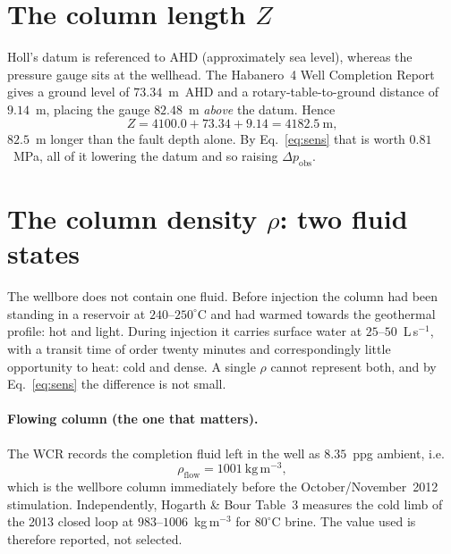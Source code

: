 \documentclass[11pt]{article}
\begin{document}
\section{The column length $Z$}

Holl's datum is referenced to AHD (approximately sea level), whereas the
pressure gauge sits at the wellhead. The Habanero~4 Well Completion Report
\cite{wcr} gives a ground level of $73.34$~m~AHD and a rotary-table-to-ground
distance of $9.14$~m, placing the gauge $82.48$~m \emph{above} the datum.
Hence
\begin{equation}
  Z = 4100.0 + 73.34 + 9.14 = 4182.5~\mathrm{m},
\end{equation}
$82.5$~m longer than the fault depth alone. By Eq.~\eqref{eq:sens} that is
worth $0.81$~MPa, all of it lowering the datum and so raising
$\Delta p_{\mathrm{obs}}$.

\section{The column density $\rho$: two fluid states}

The wellbore does not contain one fluid. Before injection the column had been
standing in a reservoir at $240$--$250^\circ$C and had warmed towards the
geothermal profile: hot and light. During injection it carries surface water at
$25$--$50$~L\,s$^{-1}$, with a transit time of order twenty minutes and
correspondingly little opportunity to heat: cold and dense. A single $\rho$
cannot represent both, and by Eq.~\eqref{eq:sens} the difference is not small.

\paragraph{Flowing column (the one that matters).}
The WCR \cite{wcr} records the completion fluid left in the well as
$8.35$~ppg ambient, i.e.
\begin{equation}
  \rho_{\mathrm{flow}} = 1001~\mathrm{kg\,m^{-3}},
\end{equation}
which is the wellbore column immediately before the October/November~2012
stimulation. Independently, Hogarth \& Bour \cite{hogarth2015} Table~3 measures
the cold limb of the 2013 closed loop at $983$--$1006$~kg\,m$^{-3}$ for
$80^\circ$C brine. The value used is therefore reported, not selected.
\end{document}
